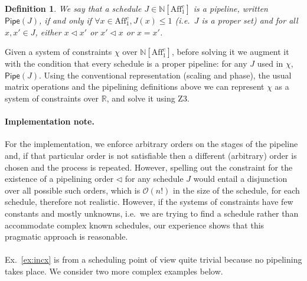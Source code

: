 \documentclass{article}
\newcommand{\aff}{\mathrm{Aff}_1^c}
\newtheorem{definition}[theorem]{Definition}
\begin{document}
\newcommand{\pipe}{\mathsf{Pipe}}
\begin{definition}\label{def:pipe}
We say that a schedule $J\in\mathbb N[\aff]$ is a \emph{pipeline}, written $\pipe(J)$, if and only if $\forall x\in \aff, J(x)\leq 1$ (i.e.\ $J$ is a proper set) and for all $x, x'\in J$,  either $x\lhd x'$ or $x'\lhd x$ or $x=x'$. 
\end{definition}

Given a system of constraints $\chi$ over $\mathbb N[\aff]$, before solving it we augment it with the condition that every schedule is a proper pipeline: for any $J$ used in $\chi$, $\pipe(J)$. Using the conventional representation (scaling and phase), the usual matrix operations and the pipelining definitions above we can represent $\chi$ as a system of constraints over $\mathbb R$, and solve it using Z3. 

\paragraph{Implementation note.} For the implementation, we enforce arbitrary orders on the stages of the pipeline and, if that particular order is not satisfiable then a different (arbitrary) order is chosen and the process is repeated. However, spelling out the constraint for the existence of a pipelining order $\lhd$ for any schedule $J$ would entail a disjunction over all possible such orders, which is $\mathcal O(n!)$ in the size of the schedule, for each schedule, therefore not realistic. However, if the systems of constraints have few constants and mostly unknowns, i.e.\ we are trying to find a schedule rather than accommodate complex known schedules, our experience shows that this pragmatic approach is reasonable. 

\paragraph{}
Ex.~\ref{ex:incx} is from a scheduling point of view quite trivial because no pipelining takes
place. We consider two more complex examples below. 
\end{document}
